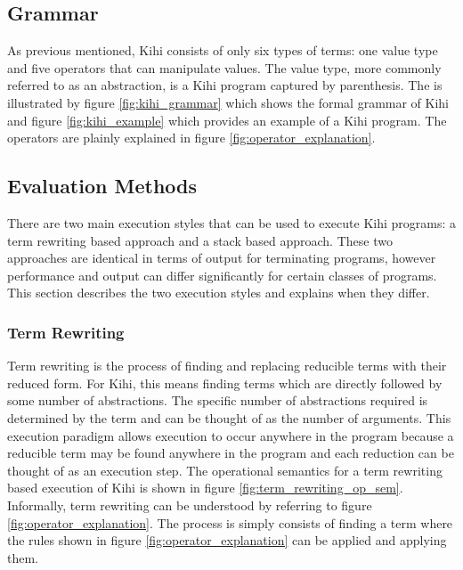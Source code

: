 \subsection{Grammar}
As previous mentioned, Kihi consists of only six types of terms: one value type and five operators that can manipulate values. The value type, more commonly referred to as an abstraction, is a Kihi program captured by parenthesis. The is illustrated by figure \ref{fig:kihi_grammar} which shows the formal grammar of Kihi and figure \ref{fig:kihi_example} which provides an example of a Kihi program. The operators are plainly explained in figure \ref{fig:operator_explanation}.






\subsection{Evaluation Methods}\label{sec:background_evaluation_methods}
There are two main execution styles that can be used to execute Kihi programs: a term rewriting based approach and a stack based approach. These two approaches are identical in terms of output for terminating programs, however performance and output can differ significantly for certain classes of programs. This section describes the two execution styles and explains when they differ.

\subsubsection{Term Rewriting}
Term rewriting is the process of finding
and replacing reducible terms with their reduced form. For Kihi,
this means finding terms which are directly followed by
some number of abstractions. The specific number of abstractions
required is determined by the term and can be thought of as the
number of arguments. This execution paradigm allows execution
to occur anywhere in the program because a reducible term may
be found anywhere in the program and each reduction can be
thought of as an execution step. The operational semantics for a term rewriting based execution of
Kihi is shown in figure \ref{fig:term_rewriting_op_sem}. Informally, term rewriting can be understood by referring to figure \ref{fig:operator_explanation}. The process is simply consists of finding a term where the rules shown in figure \ref{fig:operator_explanation} can be applied and applying them.

